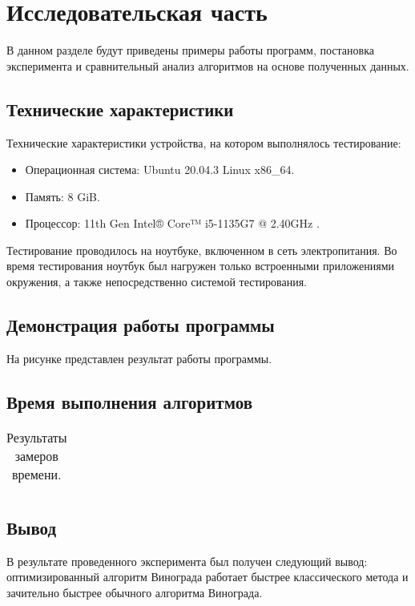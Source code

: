 \chapter{Исследовательская часть}

В данном разделе будут приведены примеры работы программ, постановка эксперимента и сравнительный анализ алгоритмов на основе полученных данных.

\section{Технические характеристики}

Технические характеристики устройства, на котором выполнялось тестирование:

\begin{itemize}
	\item Операционная система: Ubuntu 20.04.3 \cite{ubuntu} Linux \cite{linux} x86\_64.
	\item Память: 8 GiB.
	\item Процессор: 11th Gen Intel® Core™ i5-1135G7 @ 2.40GHz \cite{intel}.
\end{itemize}

Тестирование проводилось на ноутбуке, включенном в сеть электропитания. Во время тестирования ноутбук был нагружен только встроенными приложениями окружения, а также непосредственно системой тестирования.

\section{Демонстрация работы программы}

На рисунке  представлен результат работы программы.


\section{Время выполнения алгоритмов}



\begin{table}[h]
	\begin{center}
		\caption{\label{tab:time}Результаты замеров времени.}
		\begin{tabular}{|c|c|c|c|c|}
			
			
		\end{tabular}
	\end{center}
\end{table}



\section*{Вывод}

В результате проведенного эксперимента был получен следующий вывод: оптимизированный алгоритм Винограда работает быстрее классического метода и зачительно быстрее обычного алгоритма Винограда.